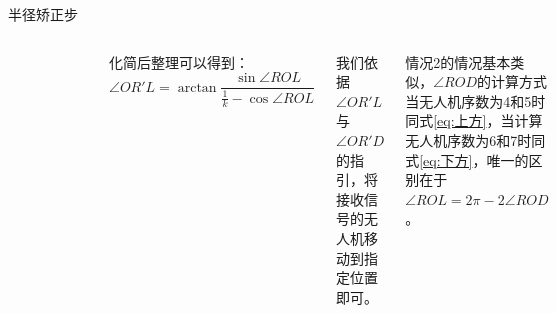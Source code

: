 \documentclass[aspectratio=169]{beamer}
\begin{document}
\begin{frame}{半径矫正步}
    \begin{columns}
        \begin{figure}[!ht]
            \centering
            \includegraphics[width=\textwidth]{图片/半径矫正步1.pdf}
        \end{figure}

        化简后整理可以得到：
        \begin{equation}
            \angle OR'L = \arctan\frac{\sin\angle ROL}{\frac{1}{k}-\cos\angle{ROL}}
        \end{equation}

        我们依据$\angle OR'L$与$\angle OR'D$的指引，将接收信号的无人机移动到指定位置即可。

        情况2的情况基本类似，$\angle ROD$的计算方式当无人机序数为4和5时同式\ref{eq:上方}，当计算无人机序数为6和7时同式\ref{eq:下方}，唯一的区别在于$\angle ROL = 2\pi - 2\angle ROD$。
    \end{columns}
\end{frame}
\end{document}
